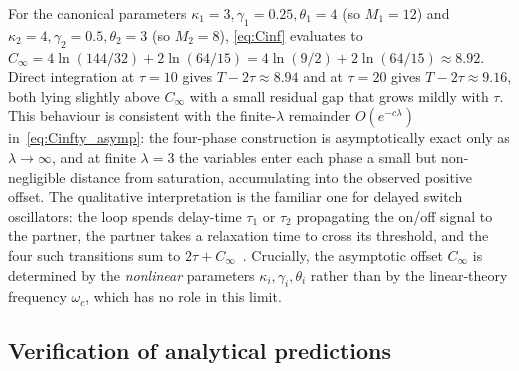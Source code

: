 \documentclass[sn-mathphys,Numbered]{sn-jnl}
\theoremstyle{thmstyleone}
\theoremstyle{thmstyletwo}
\theoremstyle{thmstylethree}
\begin{document}
For the canonical parameters $\kappa_1=3,\gamma_1=0.25,\theta_1=4$
(so $M_1=12$) and $\kappa_2=4,\gamma_2=0.5,\theta_2=3$ (so $M_2=8$),
\eqref{eq:Cinf} evaluates to
$C_\infty = 4\ln(144/32)+2\ln(64/15) = 4\ln(9/2)+2\ln(64/15)\approx 8.92$.
Direct integration at $\tau=10$ gives $T-2\tau\approx 8.94$ and at
$\tau=20$ gives $T-2\tau\approx 9.16$, both lying slightly above
$C_\infty$ with a small residual gap that grows mildly with $\tau$. This
behaviour is consistent with the finite-$\lambda$ remainder
$O(e^{-c\lambda})$ in~\eqref{eq:Cinfty_asymp}: the four-phase
construction is asymptotically exact only as $\lambda\to\infty$, and at
finite $\lambda=3$ the variables enter each phase a small but
non-negligible distance from saturation, accumulating into the observed
positive offset. The qualitative interpretation is the familiar one for
delayed switch oscillators: the loop spends delay-time $\tau_1$ or
$\tau_2$ propagating the on/off signal to the partner, the partner takes
a relaxation time to cross its threshold, and the four such transitions
sum to $2\tau+C_\infty$~\cite{glass1988rhythms,smolen2002reduced}.
Crucially, the asymptotic offset $C_\infty$ is determined by the
\emph{nonlinear} parameters $\kappa_i,\gamma_i,\theta_i$ rather than by
the linear-theory frequency $\omega_c$, which has no role in this limit.

\subsection{Verification of analytical predictions}
\end{document}
